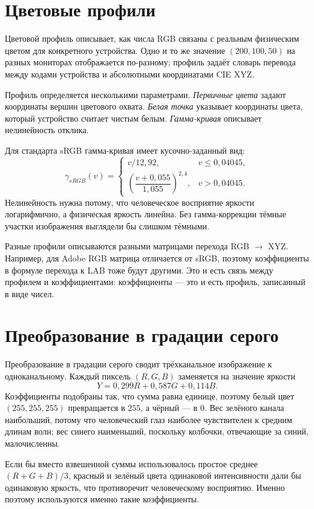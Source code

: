 \documentclass[a4paper,12pt]{article}
\begin{document}
\section{Цветовые профили}

Цветовой профиль описывает, как числа RGB связаны с реальным физическим цветом для конкретного устройства. Одно и то же значение $(200, 100, 50)$ на разных мониторах отображается по-разному; профиль задаёт словарь перевода между кодами устройства и абсолютными координатами CIE XYZ.

Профиль определяется несколькими параметрами. \emph{Первичные цвета} задают координаты вершин цветового охвата. \emph{Белая точка} указывает координаты цвета, который устройство считает чистым белым. \emph{Гамма-кривая} описывает нелинейность отклика.

Для стандарта sRGB гамма-кривая имеет кусочно-заданный вид:
\[
\gamma_{sRGB}(v) = \begin{cases}
v / 12{,}92, & v \le 0{,}04045, \\
\left(\dfrac{v + 0{,}055}{1{,}055}\right)^{2{,}4}, & v > 0{,}04045.
\end{cases}
\]
Нелинейность нужна потому, что человеческое восприятие яркости логарифмично, а физическая яркость линейна. Без гамма-коррекции тёмные участки изображения выглядели бы слишком тёмными.

Разные профили описываются разными матрицами перехода RGB $\to$ XYZ. Например, для Adobe RGB матрица отличается от sRGB, поэтому коэффициенты в формуле перехода к LAB тоже будут другими. Это и есть связь между профилем и коэффициентами: коэффициенты --- это и есть профиль, записанный в виде чисел.

\section{Преобразование в градации серого}

Преобразование в градации серого сводит трёхканальное изображение к одноканальному. Каждый пиксель $(R, G, B)$ заменяется на значение яркости
\[
Y = 0{,}299 R + 0{,}587 G + 0{,}114 B.
\]
Коэффициенты подобраны так, что сумма равна единице, поэтому белый цвет $(255, 255, 255)$ превращается в $255$, а чёрный --- в $0$. Вес зелёного канала наибольший, потому что человеческий глаз наиболее чувствителен к средним длинам волн; вес синего наименьший, поскольку колбочки, отвечающие за синий, малочисленны.

Если бы вместо взвешенной суммы использовалось простое среднее $(R+G+B)/3$, красный и зелёный цвета одинаковой интенсивности дали бы одинаковую яркость, что противоречит человеческому восприятию. Именно поэтому используются именно такие коэффициенты.
\end{document}
